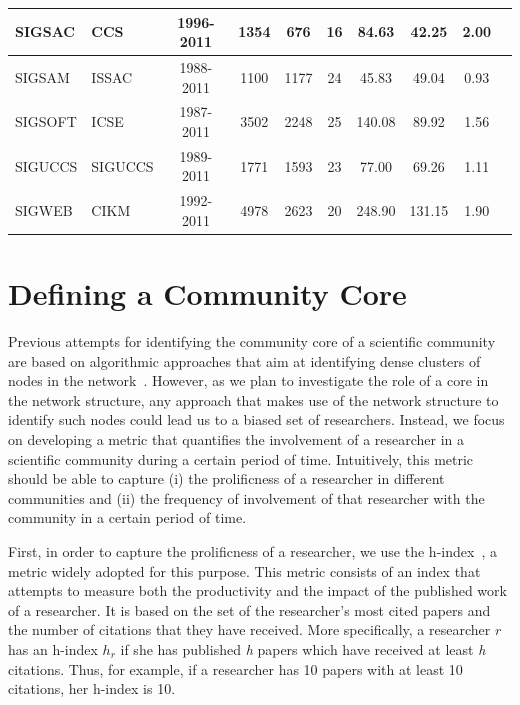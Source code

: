 \documentclass[letterpaper]{www13-companion-accepted}
\begin{document}
\begin{table}[!htb]
{\begin{tabular}{|l|l|c|c|c|c|c|c|c|c|}
SIGSAC & CCS & 1996-2011 & 1354 & 676 & 16 & 84.63 & 42.25 & 2.00\\ \hline
SIGSAM & ISSAC & 1988-2011 & 1100 & 1177 & 24 & 45.83 & 49.04 & 0.93\\ \hline
SIGSOFT & ICSE & 1987-2011 & 3502 & 2248 & 25 & 140.08 & 89.92 & 1.56\\ \hline
SIGUCCS & SIGUCCS & 1989-2011 & 1771 & 1593 & 23 & 77.00 & 69.26 & 1.11\\ \hline
SIGWEB & CIKM & 1992-2011 & 4978 & 2623 & 20 & 248.90 & 131.15 & 1.90\\ \hline
\end{tabular}
}
\end{table}


% 

\section{Defining a Community Core}

Previous attempts for identifying the community core of a scientific community are based on algorithmic approaches that aim at identifying dense clusters of nodes in the
network~\cite{Seifi:2012:CCE:2187980.2188258}.  However, as we plan to investigate the role of a core in the network structure, any approach that makes use of the network structure
to identify such nodes could lead us to a biased set of researchers. Instead, we focus on developing a metric that quantifies the involvement of a researcher in a scientific community
during a certain period of time.  Intuitively, this metric should be able to capture (i) the prolificness of a researcher in different communities and (ii) the frequency of involvement
of that researcher with the community in a certain period of time.

First, in order to capture the prolificness of a researcher, we use the h-index~\cite{Hirsch:2005}, a metric widely adopted for this purpose. This metric consists of an index that
attempts to measure both the productivity and the impact of the published work of a researcher. It is based on the set of the researcher's most cited papers and the number of
citations that they have received.  More specifically, a researcher $r$ has an h-index $h_r$ if she has published \textit{h} papers which have received at least \textit{h} citations. Thus, for
example, if a researcher has 10 papers with at least 10 citations, her h-index is 10.  
\end{document}
